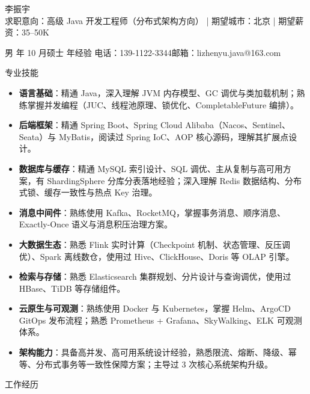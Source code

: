 \documentclass[10.5pt,fontset=windows]{ctexart}
\newcommand{\rsection}[1]{%
  \Needspace*{6\baselineskip}%
  \vspace{9pt}%
  {\color{maincolor}\heiti\zihao{4}#1}\par
  \vspace{1pt}{\color{maincolor}\rule{\textwidth}{1pt}}\par
  \vspace{3pt}}
\begin{document}
\begin{center}
  {\heiti 李振宇}\\[4pt]
  {求职意向：高级 Java 开发工程师（分布式架构方向）}\quad
  {\color{graytext}|}\quad
  {期望城市：北京}\quad
  {\color{graytext}|}\quad
  {期望薪资：35--50K}
\end{center}
\vspace{2pt}
\begin{center}
  男 年 10 月\quad 硕士 年经验\quad
  电话：139-1122-3344\quad 邮箱：lizhenyu.java@163.com
\end{center}

\rsection{专业技能}
\begin{itemize}
  \item \textbf{语言基础}：精通 Java，深入理解 JVM 内存模型、GC 调优与类加载机制；熟练掌握并发编程（JUC、线程池原理、锁优化、CompletableFuture 编排）。
  \item \textbf{后端框架}：精通 Spring Boot、Spring Cloud Alibaba（Nacos、Sentinel、Seata）与 MyBatis，阅读过 Spring IoC、AOP 核心源码，理解其扩展点设计。
  \item \textbf{数据库与缓存}：精通 MySQL 索引设计、SQL 调优、主从复制与高可用方案，有 ShardingSphere 分库分表落地经验；深入理解 Redis 数据结构、分布式锁、缓存一致性与热点 Key 治理。
  \item \textbf{消息中间件}：熟练使用 Kafka、RocketMQ，掌握事务消息、顺序消息、Exactly-Once 语义与消息积压治理方案。
  \item \textbf{大数据生态}：熟悉 Flink 实时计算（Checkpoint 机制、状态管理、反压调优）、Spark 离线数仓，使用过 Hive、ClickHouse、Doris 等 OLAP 引擎。
  \item \textbf{检索与存储}：熟悉 Elasticsearch 集群规划、分片设计与查询调优，使用过 HBase、TiDB 等存储组件。
  \item \textbf{云原生与可观测}：熟练使用 Docker 与 Kubernetes，掌握 Helm、ArgoCD GitOps 发布流程；熟悉 Prometheus + Grafana、SkyWalking、ELK 可观测体系。
  \item \textbf{架构能力}：具备高并发、高可用系统设计经验，熟悉限流、熔断、降级、幂等、分布式事务等一致性保障方案；主导过 3 次核心系统架构升级。
\end{itemize}

\rsection{工作经历}
\end{document}
